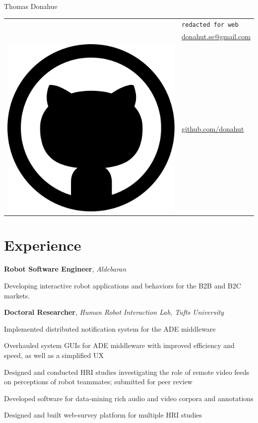 \documentclass[10pt, letter]{article}
\newcommand*\github{\includegraphics[height=2ex]{github.pdf}}
\newcommand{\years}[1]{\marginnote{\footnotesize #1}}
\newenvironment{itemize*}{
  \begin{itemize}
    \setlength{\itemsep}{0.2pt}
    \setlength{\parskip}{-1pt}
    \setlength{\parsep}{0pt}
  }{
  \end{itemize}
}
\begin{document}
\begin{minipage}[t]{0.55\textwidth}
  {\Huge Thomas Donahue}
\end{minipage}
\begin{minipage}[t]{0.4\textwidth}
  \begin{tabular}[h]{ll}
    \Phone{}    & \texttt{redacted for web}\\
    \Envelope{} & \href{mailto:donahut.se@gmail.com}{donahut.se@gmail.com}\\    
    \github{}   & \href{http://www.github.com/donahut}{github.com/donahut}
  \end{tabular}
\end{minipage}

\section*{Experience}
\years{Mar 2014--}
\textbf{Robot Software Engineer}, \textsl{Aldebaran}
\begin{itemize*}
\item Developing interactive robot applications and behaviors for the
  B2B and B2C markets.
\end{itemize*}

\years{2012 - 2014}
\textbf{Doctoral Researcher}, \textsl{Human Robot Interaction Lab,
  Tufts University}
\begin{itemize*}
\item Implemented distributed notification system for the ADE middleware
\item Overhauled system GUIs for ADE middleware with improved
  efficiency and\\ speed, as well as a simplified UX 
\item Designed and conducted HRI studies investigating the role of
  remote video feeds\\ on perceptions of robot teammates; submitted
  for peer review 
\item Developed software for data-mining rich audio and video corpora
  and annotations
\item Designed and built web-survey platform for multiple HRI studies
\end{itemize*}
\end{document}
